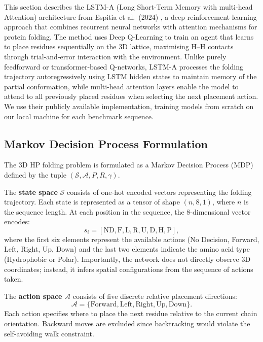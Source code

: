 \documentclass[12pt, oneside, openany]{book}
\theoremstyle{plain}
\theoremstyle{definition}
\begin{document}
This section describes the LSTM-A (Long Short-Term Memory with multi-head Attention) architecture from Espitia et al.\ (2024) \cite{Espitia2024}, a deep reinforcement learning approach that combines recurrent neural networks with attention mechanisms for protein folding. The method uses Deep Q-Learning to train an agent that learns to place residues sequentially on the 3D lattice, maximising H--H contacts through trial-and-error interaction with the environment. Unlike purely feedforward or transformer-based Q-networks, LSTM-A processes the folding trajectory autoregressively using LSTM hidden states to maintain memory of the partial conformation, while multi-head attention layers enable the model to attend to all previously placed residues when selecting the next placement action. We use their publicly available implementation, training models from scratch on our local machine for each benchmark sequence.

\subsection{Markov Decision Process Formulation}

The 3D HP folding problem is formulated as a Markov Decision Process (MDP) defined by the tuple $(\mathcal{S}, \mathcal{A}, P, R, \gamma)$.

The \textbf{state space} $\mathcal{S}$ consists of one-hot encoded vectors representing the folding trajectory. Each state is represented as a tensor of shape $(n, 8, 1)$, where $n$ is the sequence length. At each position in the sequence, the 8-dimensional vector encodes:
\begin{equation}
s_i = [\text{ND}, \text{F}, \text{L}, \text{R}, \text{U}, \text{D}, \text{H}, \text{P}],
\end{equation}
where the first six elements represent the available actions (No Decision, Forward, Left, Right, Up, Down) and the last two elements indicate the amino acid type (Hydrophobic or Polar). Importantly, the network does not directly observe 3D coordinates; instead, it infers spatial configurations from the sequence of actions taken.

The \textbf{action space} $\mathcal{A}$ consists of five discrete relative placement directions:
\begin{equation}
\mathcal{A} = \{\text{Forward}, \text{Left}, \text{Right}, \text{Up}, \text{Down}\}.
\end{equation}
Each action specifies where to place the next residue relative to the current chain orientation. Backward moves are excluded since backtracking would violate the self-avoiding walk constraint.
\end{document}
